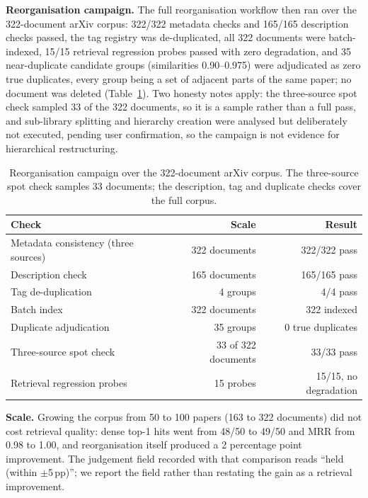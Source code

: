 \textbf{Reorganisation campaign.} The full reorganisation workflow then ran over the 322-document arXiv corpus: 322/322 metadata checks and 165/165 description checks passed, the tag registry was de-duplicated, all 322 documents were batch-indexed, 15/15 retrieval regression probes passed with zero degradation, and 35 near-duplicate candidate groups (similarities 0.90--0.975) were adjudicated as zero true duplicates, every group being a set of adjacent parts of the same paper; no document was deleted (Table~\ref{tab:org-campaign}). Two honesty notes apply: the three-source spot check sampled 33 of the 322 documents, so it is a sample rather than a full pass, and sub-library splitting and hierarchy creation were analysed but deliberately not executed, pending user confirmation, so the campaign is not evidence for hierarchical restructuring.

\begin{table}[t]
\centering
\small
\setlength{\tabcolsep}{2pt}
\caption{Reorganisation campaign over the 322-document arXiv corpus.
The three-source spot check samples 33 documents; the description, tag and
duplicate checks cover the full corpus.}
\label{tab:org-campaign}
\begin{tabular}{@{}lrr@{}}
\toprule
Check & Scale & Result \\
\midrule
Metadata consistency (three sources) & 322 documents & 322/322 pass \\
Description check & 165 documents & 165/165 pass \\
Tag de-duplication & 4 groups & 4/4 pass \\
Batch index & 322 documents & 322 indexed \\
Duplicate adjudication & 35 groups & 0 true duplicates \\
Three-source spot check & 33 of 322 documents & 33/33 pass \\
Retrieval regression probes & 15 probes & 15/15, no degradation \\
\bottomrule
\end{tabular}
\end{table}

\textbf{Scale.} Growing the corpus from 50 to 100 papers (163 to 322 documents) did not cost retrieval quality: dense top-1 hits went from 48/50 to 49/50 and MRR from 0.98 to 1.00, and reorganisation itself produced a 2 percentage point improvement. The judgement field recorded with that comparison reads ``held (within $\pm$5\,pp)''; we report the field rather than restating the gain as a retrieval improvement.

